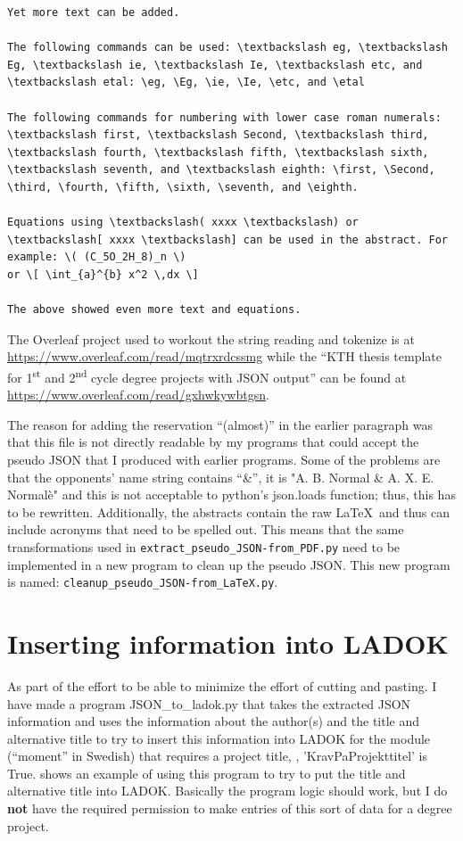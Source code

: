 \begin{lstlisting}[language={}, caption={Source \LaTeX~(from inside the scontents of the abstract)}, label=lst:JSONtoLadokK]
Yet more text can be added.

The following commands can be used: \textbackslash eg, \textbackslash Eg, \textbackslash ie, \textbackslash Ie, \textbackslash etc, and \textbackslash etal: \eg, \Eg, \ie, \Ie, \etc, and \etal

The following commands for numbering with lower case roman numerals: \textbackslash first, \textbackslash Second, \textbackslash third, \textbackslash fourth, \textbackslash fifth, \textbackslash sixth, \textbackslash seventh, and \textbackslash eighth: \first, \Second, \third, \fourth, \fifth, \sixth, \seventh, and \eighth.

Equations using \textbackslash( xxxx \textbackslash) or \textbackslash[ xxxx \textbackslash] can be used in the abstract. For example: \( (C_5O_2H_8)_n \)
or \[ \int_{a}^{b} x^2 \,dx \]

The above showed even more text and equations.
\end{lstlisting}


The Overleaf project used to workout the string reading and tokenize is at \url{https://www.overleaf.com/read/mqtrxrdcssmg} while the “KTH thesis template for 1\textsuperscript{st} and 2\textsuperscript{nd} cycle degree projects with JSON output” can be found at \url{https://www.overleaf.com/read/gxhwkywbtgsn}.

The reason for adding the reservation “(almost)” in the earlier paragraph was that this file is not directly readable by my programs that could accept the pseudo JSON that I produced with earlier programs. Some of the problems are that the opponents’ name string contains “\&”, \ie it is "A. B. Normal \& A. X. E. Normalè" and this is not acceptable to python’s json.loads{} function; thus, this has to be rewritten. Additionally, the abstracts contain the raw \LaTeX~and thus can include acronyms that need to be spelled out. This means that the same transformations used in \texttt{extract\_pseudo\_JSON-from\_PDF.py} need to be implemented in a new program to clean up the pseudo JSON. This new program is named: \texttt{cleanup\_pseudo\_JSON-from\_LaTeX.py}.


\section[Inserting information into LADOK]{Inserting information into LADOK}
\label{sec:JSONtoLADOK}
As part of the effort to be able to minimize the effort of cutting and pasting. I have made a program JSON\_to\_ladok.py that takes the extracted JSON information and uses the information about the author(s) and the title and alternative title to try to insert this information into LADOK for the module (\ie ``moment'' in Swedish) that requires a project title, \ie, 'KravPaProjekttitel' is True.  shows an example of using this program to try to put the title and alternative title into LADOK. Basically the program logic should work, but I do \textbf{not} have the required permission to make entries of this sort of data for a degree project.


